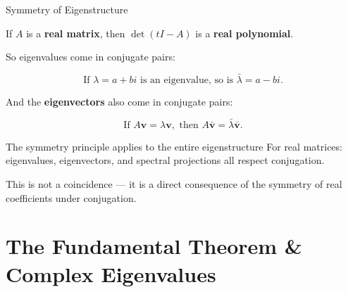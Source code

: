 \documentclass[10pt]{beamer}
\theoremstyle{definition}
\newcommand{\x}[1]{\alert{\textbf{#1}}}
\begin{document}
\begin{frame}{Symmetry of Eigenstructure}

If $A$ is a \x{real matrix}, then $\det(tI - A)$ is a \x{real polynomial}.

\vfill

So eigenvalues come in conjugate pairs:

$$\text{If } \lambda = a + bi \text{ is an eigenvalue, so is } \bar{\lambda} = a - bi.$$

\vfill\pause

And the \x{eigenvectors} also come in conjugate pairs:

$$\text{If } A\mathbf{v} = \lambda \mathbf{v}, \text{ then } A\bar{\mathbf{v}} = \bar{\lambda}\bar{\mathbf{v}}.$$

\vfill\pause

\begin{block}{The symmetry principle applies to the entire eigenstructure}
For real matrices: eigenvalues, eigenvectors, and spectral projections all respect conjugation.

\vfill

This is not a coincidence --- it is a direct consequence of the symmetry of real coefficients under conjugation.
\end{block}

\end{frame}


\section[Fundamental Theorem \& Eigenvalues]{The Fundamental Theorem \& Complex Eigenvalues}
\end{document}
